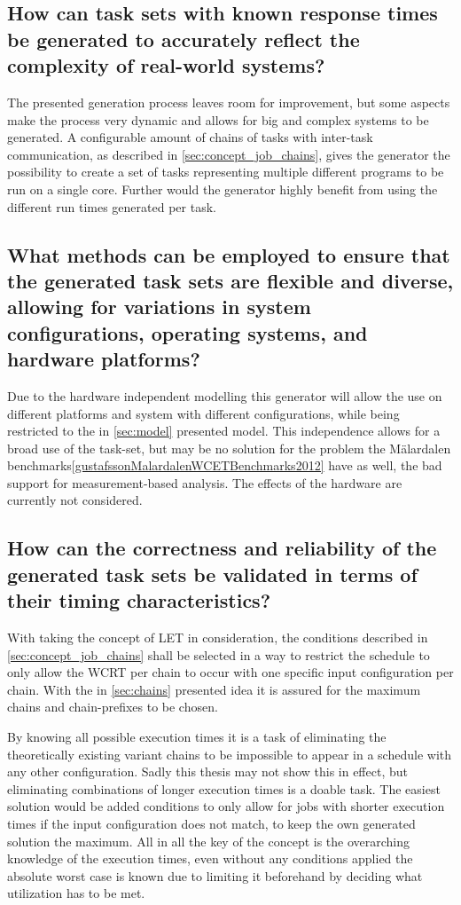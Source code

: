 \subsection{How can task sets with known response times be generated to accurately reflect the complexity of real-world systems?}\label{subsec:summary:Q1}
The presented generation process leaves room for improvement, but some aspects make the process very dynamic and allows for big and complex systems to be generated.
A configurable amount of chains of tasks with inter-task communication, as described in \cref{sec:concept_job_chains}, gives the generator the possibility to create a set of tasks representing multiple different programs to be run on a single core.
Further would the generator highly benefit from using the different run times generated per task.

\subsection{What methods can be employed to ensure that the generated task sets are flexible and diverse, allowing for variations in system configurations, operating systems, and hardware platforms?}\label{subsec:summary:Q2}
Due to the hardware independent modelling this generator will allow the use on different platforms and system with different configurations, while being restricted to the in \cref{sec:model} presented model.
This independence allows for a broad use of the task-set, but may be no solution for the problem the Mälardalen benchmarks\cref{gustafssonMalardalenWCETBenchmarks2012} have as well, the bad support for measurement-based analysis.
The effects of the hardware are currently not considered.

\subsection{How can the correctness and reliability of the generated task sets be validated in terms of their timing characteristics?}\label{subsec:summary:Q3}
With taking the concept of \ac{LET} in consideration, the conditions described in \cref{sec:concept_job_chains} shall be selected in a way to restrict the schedule to only allow the \ac{WCRT} per chain to occur with one specific input configuration per chain.
With the in \cref{sec:chains} presented idea it is assured for the maximum chains and chain-prefixes to be chosen.

By knowing all possible execution times it is a task of eliminating the theoretically existing variant chains to be impossible to appear in a schedule with any other configuration.
Sadly this thesis may not show this in effect, but eliminating combinations of longer execution times is a doable task.
The easiest solution would be added conditions to only allow for jobs with shorter execution times if the input configuration does not match, to keep the own generated solution the maximum.
All in all the key of the concept is the overarching knowledge of the execution times, even without any conditions applied the absolute worst case is known due to limiting it beforehand by deciding what utilization has to be met.

